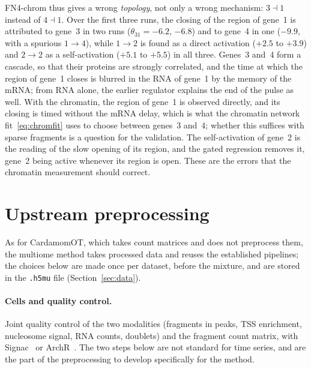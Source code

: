 \documentclass[a4paper, 11pt]{article}
\theoremstyle{plain}
\theoremstyle{remark}
\begin{document}
FN4-chrom thus gives a wrong \emph{topology}, not only a wrong mechanism: $3 \dashv 1$ instead of $4 \dashv 1$. Over the first three runs, the closing of the region of gene~1 is attributed to gene~3 in two runs ($\theta_{31} = -6.2$, $-6.8$) and to gene~4 in one ($-9.9$, with a spurious $1 \to 4$), while $1 \to 2$ is found as a direct activation ($+2.5$ to $+3.9$) and $2 \to 2$ as a self-activation ($+5.1$ to $+5.5$) in all three. Genes~3 and~4 form a cascade, so that their proteins are strongly correlated, and the time at which the region of gene~1 closes is blurred in the RNA of gene~1 by the memory of the mRNA; from RNA alone, the earlier regulator explains the end of the pulse as well. With the chromatin, the region of gene~1 is observed directly, and its closing is timed without the mRNA delay, which is what the chromatin network fit~\eqref{eq:chromfit} uses to choose between genes~3 and~4; whether this suffices with sparse fragments is a question for the validation. The self-activation of gene~2 is the reading of the slow opening of its region, and the gated regression removes it, gene~2 being active whenever its region is open. These are the errors that the chromatin measurement should correct.

\section{Upstream preprocessing}\label{sec:preproc}

As for CardamomOT, which takes count matrices and does not preprocess them, the multiome method takes processed data and reuses the established pipelines; the choices below are made once per dataset, before the mixture, and are stored in the \texttt{.h5mu} file (Section~\ref{sec:data}).

\paragraph{Cells and quality control.} Joint quality control of the two modalities (fragments in peaks, TSS enrichment, nucleosome signal, RNA counts, doublets) and the fragment count matrix, with Signac~\cite{stuart2021signac} or ArchR~\cite{granja2021archr}. The two steps below are not standard for time series, and are the part of the preprocessing to develop specifically for the method.
\end{document}
